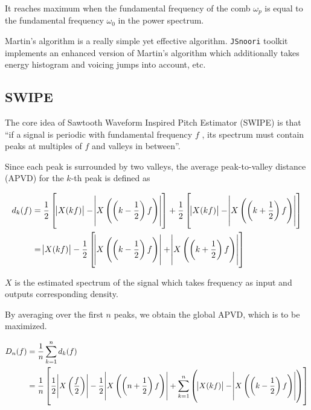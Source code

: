 \documentclass[11pt,a4paper]{report}
\begin{document}
It reaches maximum when the fundamental frequency of the comb \(\omega_p\) is equal to the fundamental frequency \(\omega_0\) in the power spectrum.

Martin's algorithm is a really simple yet effective algorithm.
\texttt{JSnoori} toolkit implements an enhanced version of Martin's algorithm which additionally takes energy histogram and voicing jumps into account, etc.

\subsection{SWIPE}

The core idea of Sawtooth Waveform Inspired Pitch Estimator (SWIPE) is that \enquote{if a signal is periodic with fundamental frequency \(f\) , its spectrum must contain peaks at multiples of \(f\)  and valleys in between}.

Since each peak is surrounded by two valleys, the average peak-to-valley distance (APVD) for the \(k\)-th peak is defined as

\begin{equation}
  \begin{split}
    d_k(f) & = \frac{1}{2} \left[ \abs{X(kf)} - \abs{X \left( \left(k - \frac{1}{2}\right) f \right)} \right] + \frac{1}{2} \left[ \abs{X(kf)} - \abs{X \left( \left(k + \frac{1}{2} \right) f \right)} \right] \\
      & = \abs{X(kf)} - \frac{1}{2} \left[ \abs{X \left( \left(k - \frac{1}{2}\right) f \right)} + \abs{X \left( \left(k + \frac{1}{2}\right) f \right)} \right]
  \end{split}
\end{equation}

\(X\) is the estimated spectrum of the signal which takes frequency as input and outputs corresponding density.

By averaging over the first \(n\) peaks, we obtain the global APVD, which is to be maximized.

\begin{equation}
  \begin{split}
    D_n(f) & = \frac{1}{n} \sum_{k=1}^{n} d_k(f) \\
      & = \frac{1}{n} \left[ \frac{1}{2} \abs{X \left( \frac{f}{2} \right)} - \frac{1}{2} \abs{X \left( \left(n + \frac{1}{2}\right) f \right)} + \sum_{k=1}^{n} \left( \abs{X(kf)} - \abs{X \left( \left(k - \frac{1}{2}\right) f \right)} \right) \right]
  \end{split}
\end{equation}
\end{document}
